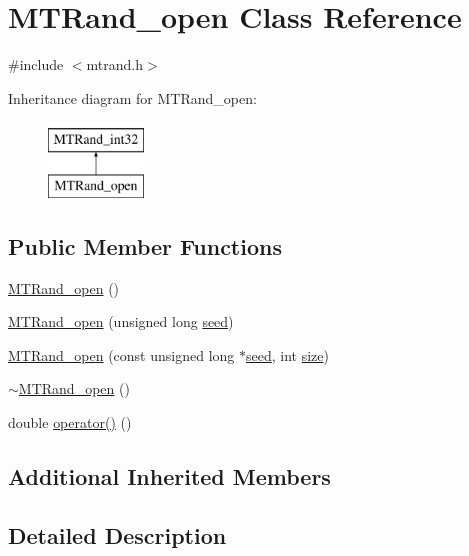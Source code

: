 \hypertarget{class_m_t_rand__open}{\section{M\-T\-Rand\-\_\-open Class Reference}
\label{class_m_t_rand__open}
}


{\ttfamily \#include $<$mtrand.\-h$>$}

Inheritance diagram for M\-T\-Rand\-\_\-open\-:\begin{figure}[H]
\begin{center}
\leavevmode
\includegraphics[height=2.000000cm]{class_m_t_rand__open}
\end{center}
\end{figure}
\subsection*{Public Member Functions}
\begin{DoxyCompactItemize}
\item 
\hyperlink{class_m_t_rand__open_a58140b54564be39382da163954177389}{M\-T\-Rand\-\_\-open} ()
\item 
\hyperlink{class_m_t_rand__open_a1f55ebc1052f5343f8d6e08a752ef957}{M\-T\-Rand\-\_\-open} (unsigned long \hyperlink{class_m_t_rand__int32_a0c57076fe30358e0700a7ce1baa0ea27}{seed})
\item 
\hyperlink{class_m_t_rand__open_a0216992f4dfa5acf22ee8c585eeac488}{M\-T\-Rand\-\_\-open} (const unsigned long $\ast$\hyperlink{class_m_t_rand__int32_a0c57076fe30358e0700a7ce1baa0ea27}{seed}, int \hyperlink{crea__e__controlla__i__catalizzatori_8m_ae113ea7f9e515a12ac4b5595c6faf61e}{size})
\item 
\hyperlink{class_m_t_rand__open_a4f4774b5d9b79972dedaec984b248581}{$\sim$\-M\-T\-Rand\-\_\-open} ()
\item 
double \hyperlink{class_m_t_rand__open_ac408aa400ca59fc2afc888d88f98d807}{operator()} ()
\end{DoxyCompactItemize}
\subsection*{Additional Inherited Members}


\subsection{Detailed Description}


